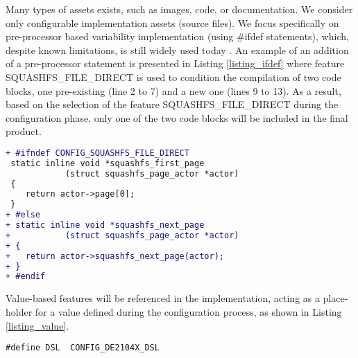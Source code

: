 \begin{sloppypar}
Many types of assets exists, such as images, code, or documentation. We consider only configurable implementation assets (source files).
We focus specifically on pre-processor based variability implementation (using \#ifdef statements), which, 
despite known limitations\citep{spencer_ifdef_1992}, is still widely used today \citep{liebig_analysis_2010}.
An example of an addition of a pre-processor statement is presented in Listing \ref{listing_ifdef} 
where feature SQUASHFS\_FILE\_DIRECT is used to condition the compilation of two code blocks, 
one pre-existing (line 2 to 7) and a new one (lines 9 to 13).
As a result, based on the selection of the feature SQUASHFS\_FILE\_DIRECT during the configuration phase, only one of the two code blocks
will be included in the final product.
\end{sloppypar}
\vspace{-.5ex}
\begin{lstlisting}[caption=Creating an \#ifdef block in Linux,label=listing_ifdef,language=diff] 
+ #ifndef CONFIG_SQUASHFS_FILE_DIRECT
 static inline void *squashfs_first_page
 			(struct squashfs_page_actor *actor)
 {
 	return actor->page[0];
 }
+ #else
+ static inline void *squashfs_next_page
+			(struct squashfs_page_actor *actor)
+ {
+	return actor->squashfs_next_page(actor);
+ }
+ #endif
\end{lstlisting}
\vspace{-.5ex}
Value-based features will be referenced in the implementation, acting as a place-holder for a value defined during the configuration process,
as shown in Listing \ref{listing_value}.
\vspace{-.5ex}
\begin{lstlisting}[caption=Referencing to a value feature where the variable DSL will take the value associated with feature DE2104X\_DSL,label=listing_value] 
#define DSL  CONFIG_DE2104X_DSL
\end{lstlisting}
\vspace{-.5ex}

